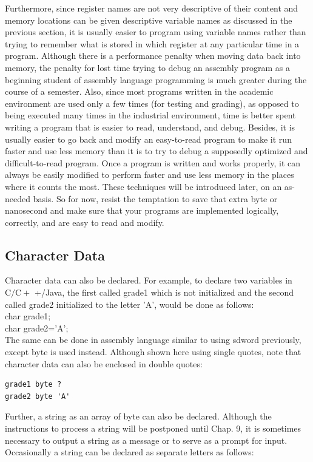 \documentclass[10pt]{article}
\begin{document}
Furthermore, since register names are not very descriptive of their content and memory locations can be given descriptive variable names as discussed in the previous section, it is usually easier to program using variable names rather than trying to remember what is stored in which register at any particular time in a program. Although there is a performance penalty when moving data back into memory, the penalty for lost time trying to debug an assembly program as a beginning student of assembly language programming is much greater during the course of a semester. Also, since most programs written in the academic environment are used only a few times (for testing and grading), as opposed to being executed many times in the industrial environment, time is better spent writing a program that is easier to read, understand, and debug. Besides, it is usually easier to go back and modify an easy-to-read program to make it run faster and use less memory than it is to try to debug a supposedly optimized and difficult-to-read program. Once a program is written and works properly, it can always be easily modified to perform faster and use less memory in the places where it counts the most. These techniques will be introduced later, on an as-needed basis. So for now, resist the temptation to save that extra byte or nanosecond and make sure that your programs are implemented logically, correctly, and are easy to read and modify.

\subsection*{Character Data}
Character data can also be declared. For example, to declare two variables in $\mathrm{C} / \mathrm{C}+$ +/Java, the first called grade1 which is not initialized and the second called grade2 initialized to the letter 'A', would be done as follows:\\
char grade1;\\
char grade2='A';\\
The same can be done in assembly language similar to using sdword previously, except byte is used instead. Although shown here using single quotes, note that character data can also be enclosed in double quotes:

\begin{verbatim}
grade1 byte ?
grade2 byte 'A'
\end{verbatim}

Further, a string as an array of byte can also be declared. Although the instructions to process a string will be postponed until Chap. 9, it is sometimes necessary to output a string as a message or to serve as a prompt for input. Occasionally a string can be declared as separate letters as follows:
\end{document}
